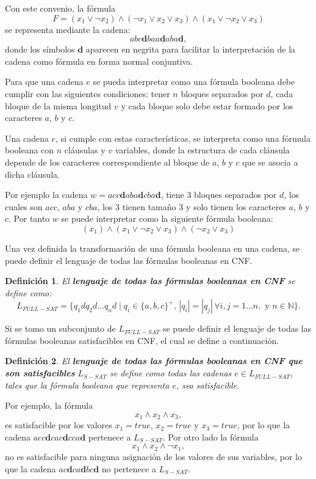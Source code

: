 \documentclass[12pt]{article}
\newtheorem{definition}{Definición}
\begin{document}
Con este convenio, la fórmula
$$ F=(x_1 \vee \neg x_2) \wedge (\neg x_1 \vee x_2 \vee x_3) \wedge (x_1 \vee \neg x_2 \vee x_3)$$
se representa mediante la cadena:
$$abc\mathbf{d}baa\mathbf{d}aba\mathbf{d},$$
donde los símbolos $\mathbf{d}$ aparecen en negrita para facilitar la interpretación de la cadena como fórmula 
en forma normal conjuntiva.

Para que una cadena $e$ se pueda interpretar como una fórmula booleana debe cumplir con las siguientes condiciones:
tener $n$ bloques separados por $d$, cada bloque de la misma longitud $v$ y cada bloque solo debe estar formado por los caracteres
$a$, $b$ y $c$. 

Una cadena $e$, si cumple con estas características,  se interpreta como una fórmula booleana con $n$ cláusulas y $v$ variables, donde la estructura de cada cláusula depende de los caracteres correspondiente al bloque de $a$, $b$ y $c$ que se asocia a dicha cláusula.

Por ejemplo la cadena $w=acc\mathbf{d}aba\mathbf{d}cba\mathbf{d}$, tiene 3 bloques separados por $d$, los cuales son $acc$, $aba$ y $cba$, los 3 tienen tamaño 3 y solo tienen los caracteres $a$, $b$ y $c$.
Por tanto  $w$ se puede interpretar como la siguiente fórmula booleana:
$$(x_1)\wedge(x_1\vee \neg x_2 \vee x_3) \wedge (\neg x_2\vee x_3)$$

Una vez definida la transformación de una fórmula booleana en una cadena, se puede definir el lenguaje de todas las fórmulas booleanas en CNF.

\begin{definition}
    El \textbf{lenguaje de todas las fórmulas booleanas en CNF} se define como:
    \[
        L_{FULL-SAT} = \{ q_1dq_2d\dots q_nd \mid q_i \in \{a, b,c\}^+\text{, }
        |q_i| = |q_j| \, \forall i, j =1\dots n, \text{ y } n\in \mathbb{N}\}.
    \]
\end{definition}

Si se tomo un subconjunto de $L_{FULL-SAT}$ se puede definir el lenguaje de todas las fórmulas booleanas satisfacibles
en CNF, el cual se define a continuación.

\begin{definition}
    El \textbf{lenguaje de todas las fórmulas booleanas en CNF que son satisfacibles} $L_{S-SAT}$ se define como todas las cadenas $e\in L_{FULL-SAT}$,
    tales que la fórmula booleana que representa $e$, sea satisfacible.
\end{definition}

Por ejemplo, la fórmula $$x_1\wedge x_2 \wedge x_3,$$ es satisfacible por los valores $x_1=true$, $x_2=true$ y $x_3=true$, por lo que la 
cadena $acc\mathbf{d}cac\mathbf{d}cca\mathbf{d}$ pertenece a $L_{S-SAT}$. Por otro lado la fórmula $$x_1\wedge x_2 \wedge \neg x_1,$$
no es satisfacible para ninguna asignación de los valores de sus variables, por lo que la cadena $ac\mathbf{d}ca\mathbf{d}bc\mathbf{d}$
no pertenece a $L_{S-SAT}$.
\end{document}
